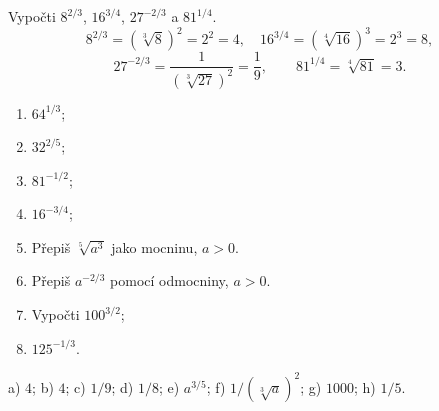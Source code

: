 \documentclass[11pt,a4paper]{article}
\begin{document}
\begin{prikladReseniBox}[title={Příklad 1: nejprve odmocni, pak umocni}]
Vypočti $8^{2/3}$, $16^{3/4}$, $27^{-2/3}$ a $81^{1/4}$.
\tcblower
\[
8^{2/3}=(\sqrt[3]8)^2=2^2=4,\quad
16^{3/4}=(\sqrt[4]{16})^3=2^3=8,
\]
\[
27^{-2/3}=\frac1{(\sqrt[3]{27})^2}=\frac19,\qquad
81^{1/4}=\sqrt[4]{81}=3.
\]
\end{prikladReseniBox}
\begin{zadaniReseniBox}[title={Samostatná práce 1: převody a výpočty}]
\begin{enumerate}[label=\alph*)]
\item $64^{1/3}$; \item $32^{2/5}$; \item $81^{-1/2}$;
\item $16^{-3/4}$;
\item Přepiš $\sqrt[5]{a^3}$ jako mocninu, $a>0$.
\item Přepiš $a^{-2/3}$ pomocí odmocniny, $a>0$.
\item Vypočti $100^{3/2}$; \item $125^{-1/3}$.
\end{enumerate}
\tcblower
 a) $4$; b) $4$; c) $1/9$; d) $1/8$;
 e) $a^{3/5}$; f) $1/(\sqrt[3]a)^2$;
 g) $1000$; h) $1/5$.
\end{zadaniReseniBox}
\end{document}
